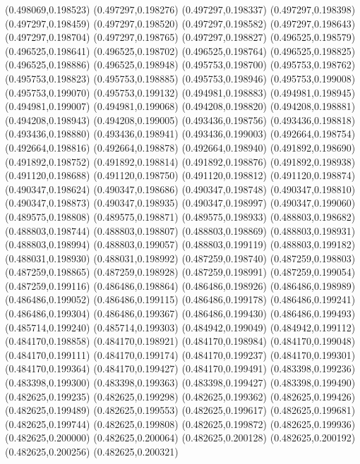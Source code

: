(0.498069,0.198523)
(0.497297,0.198276)
(0.497297,0.198337)
(0.497297,0.198398)
(0.497297,0.198459)
(0.497297,0.198520)
(0.497297,0.198582)
(0.497297,0.198643)
(0.497297,0.198704)
(0.497297,0.198765)
(0.497297,0.198827)
(0.496525,0.198579)
(0.496525,0.198641)
(0.496525,0.198702)
(0.496525,0.198764)
(0.496525,0.198825)
(0.496525,0.198886)
(0.496525,0.198948)
(0.495753,0.198700)
(0.495753,0.198762)
(0.495753,0.198823)
(0.495753,0.198885)
(0.495753,0.198946)
(0.495753,0.199008)
(0.495753,0.199070)
(0.495753,0.199132)
(0.494981,0.198883)
(0.494981,0.198945)
(0.494981,0.199007)
(0.494981,0.199068)
(0.494208,0.198820)
(0.494208,0.198881)
(0.494208,0.198943)
(0.494208,0.199005)
(0.493436,0.198756)
(0.493436,0.198818)
(0.493436,0.198880)
(0.493436,0.198941)
(0.493436,0.199003)
(0.492664,0.198754)
(0.492664,0.198816)
(0.492664,0.198878)
(0.492664,0.198940)
(0.491892,0.198690)
(0.491892,0.198752)
(0.491892,0.198814)
(0.491892,0.198876)
(0.491892,0.198938)
(0.491120,0.198688)
(0.491120,0.198750)
(0.491120,0.198812)
(0.491120,0.198874)
(0.490347,0.198624)
(0.490347,0.198686)
(0.490347,0.198748)
(0.490347,0.198810)
(0.490347,0.198873)
(0.490347,0.198935)
(0.490347,0.198997)
(0.490347,0.199060)
(0.489575,0.198808)
(0.489575,0.198871)
(0.489575,0.198933)
(0.488803,0.198682)
(0.488803,0.198744)
(0.488803,0.198807)
(0.488803,0.198869)
(0.488803,0.198931)
(0.488803,0.198994)
(0.488803,0.199057)
(0.488803,0.199119)
(0.488803,0.199182)
(0.488031,0.198930)
(0.488031,0.198992)
(0.487259,0.198740)
(0.487259,0.198803)
(0.487259,0.198865)
(0.487259,0.198928)
(0.487259,0.198991)
(0.487259,0.199054)
(0.487259,0.199116)
(0.486486,0.198864)
(0.486486,0.198926)
(0.486486,0.198989)
(0.486486,0.199052)
(0.486486,0.199115)
(0.486486,0.199178)
(0.486486,0.199241)
(0.486486,0.199304)
(0.486486,0.199367)
(0.486486,0.199430)
(0.486486,0.199493)
(0.485714,0.199240)
(0.485714,0.199303)
(0.484942,0.199049)
(0.484942,0.199112)
(0.484170,0.198858)
(0.484170,0.198921)
(0.484170,0.198984)
(0.484170,0.199048)
(0.484170,0.199111)
(0.484170,0.199174)
(0.484170,0.199237)
(0.484170,0.199301)
(0.484170,0.199364)
(0.484170,0.199427)
(0.484170,0.199491)
(0.483398,0.199236)
(0.483398,0.199300)
(0.483398,0.199363)
(0.483398,0.199427)
(0.483398,0.199490)
(0.482625,0.199235)
(0.482625,0.199298)
(0.482625,0.199362)
(0.482625,0.199426)
(0.482625,0.199489)
(0.482625,0.199553)
(0.482625,0.199617)
(0.482625,0.199681)
(0.482625,0.199744)
(0.482625,0.199808)
(0.482625,0.199872)
(0.482625,0.199936)
(0.482625,0.200000)
(0.482625,0.200064)
(0.482625,0.200128)
(0.482625,0.200192)
(0.482625,0.200256)
(0.482625,0.200321)
